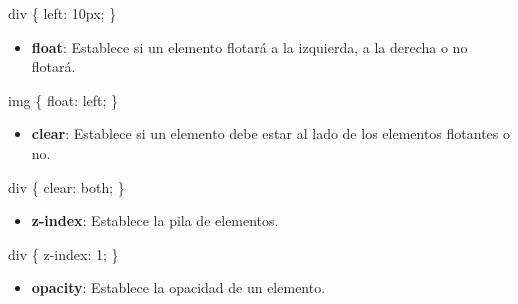 \documentclass[
  a4paper,
  DIV=11,
  numbers=noendperiod,
  onepage,
  openany]{scrreprt}
\newenvironment{Shaded}{\begin{snugshade}}{\end{snugshade}}
\newcommand{\DataTypeTok}[1]{\textcolor[rgb]{0.68,0.00,0.00}{#1}}
\newcommand{\DecValTok}[1]{\textcolor[rgb]{0.68,0.00,0.00}{#1}}
\newcommand{\KeywordTok}[1]{\textcolor[rgb]{0.00,0.23,0.31}{#1}}
\newcommand{\NormalTok}[1]{\textcolor[rgb]{0.00,0.23,0.31}{#1}}
\newcommand{\OperatorTok}[1]{\textcolor[rgb]{0.37,0.37,0.37}{#1}}
\providecommand{\tightlist}{%
  \setlength{\itemsep}{0pt}\setlength{\parskip}{0pt}}\usepackage{longtable,booktabs,array}
\begin{document}
\begin{Shaded}
\begin{Highlighting}[]
\NormalTok{div \{}
  \KeywordTok{left}\NormalTok{: }\DecValTok{10}\DataTypeTok{px}\OperatorTok{;}
\NormalTok{\}}
\end{Highlighting}
\end{Shaded}

\begin{itemize}
\tightlist
\item
  \textbf{float}: Establece si un elemento flotará a la izquierda, a la
  derecha o no flotará.
\end{itemize}

\begin{Shaded}
\begin{Highlighting}[]
\NormalTok{img \{}
  \KeywordTok{float}\NormalTok{: }\DecValTok{left}\OperatorTok{;}
\NormalTok{\}}
\end{Highlighting}
\end{Shaded}

\begin{itemize}
\tightlist
\item
  \textbf{clear}: Establece si un elemento debe estar al lado de los
  elementos flotantes o no.
\end{itemize}

\begin{Shaded}
\begin{Highlighting}[]
\NormalTok{div \{}
  \KeywordTok{clear}\NormalTok{: }\DecValTok{both}\OperatorTok{;}
\NormalTok{\}}
\end{Highlighting}
\end{Shaded}

\begin{itemize}
\tightlist
\item
  \textbf{z-index}: Establece la pila de elementos.
\end{itemize}

\begin{Shaded}
\begin{Highlighting}[]
\NormalTok{div \{}
  \KeywordTok{z{-}index}\NormalTok{: }\DecValTok{1}\OperatorTok{;}
\NormalTok{\}}
\end{Highlighting}
\end{Shaded}

\begin{itemize}
\tightlist
\item
  \textbf{opacity}: Establece la opacidad de un elemento.
\end{itemize}
\end{document}
